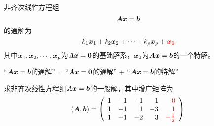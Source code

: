 \begin{frame}
非齐次线性方程组
$$\A\xx=\bb$$
的通解为
$$
k_1\xx_1+k_2\xx_2+\cd+k_p\xx_p + \red{\xx_0}
$$
其中$\xx_1,\xx_2,\cd,\xx_p$为$\A\xx=\zero$的基础解系，$\xx_0$为$\A\xx=\bb$的一个特解。
\end{frame}

\begin{frame}
\begin{zhu*}
  “$\A\xx=\bb$的通解” =  “$\A\xx=\zero$的通解” + “$\A\xx=\bb$的特解”
\end{zhu*}
\end{frame}

\begin{frame}
\begin{li}
  求非齐次线性方程组$\A\xx=\bb$的一般解，其中增广矩阵为
  $$
  (\A,\bb) = \left(
    \begin{array}{rrrrr}
      1&-1&-1& 1&\red{0}\\
      1&-1& 1&-3&\red{1}\\
      1&-1&-2& 3&\red{-\frac12}
    \end{array}
  \right)
  $$
\end{li}
\end{frame}

